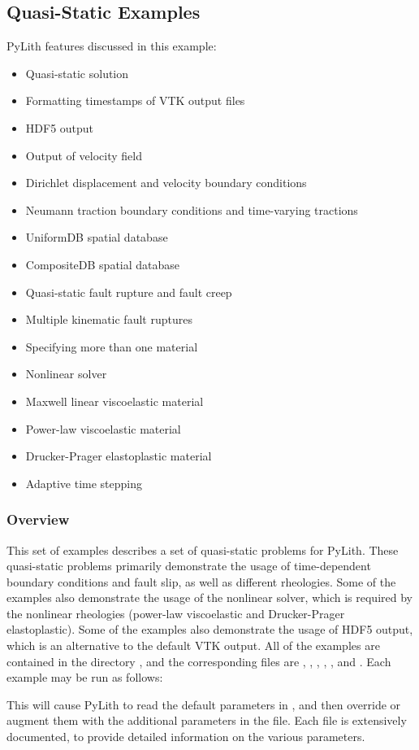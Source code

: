 \subsection{Quasi-Static Examples}
\label{sec:example:3dhex8-quasistatic}

PyLith features discussed in this example:
\begin{itemize}
\item Quasi-static solution
\item Formatting timestamps of VTK output files
\item HDF5 output
\item Output of velocity field
\item Dirichlet displacement and velocity boundary conditions
\item Neumann traction boundary conditions and time-varying tractions
\item UniformDB spatial database
\item CompositeDB spatial database
\item Quasi-static fault rupture and fault creep
\item Multiple kinematic fault ruptures
\item Specifying more than one material
\item Nonlinear solver
\item Maxwell linear viscoelastic material
\item Power-law viscoelastic material
\item Drucker-Prager elastoplastic material
\item Adaptive time stepping
\end{itemize}

\subsubsection{Overview}

This set of examples describes a set of quasi-static problems for
PyLith. These quasi-static problems primarily demonstrate the usage
of time-dependent boundary conditions and fault slip, as well as different
rheologies. Some of the examples also demonstrate the usage of the
nonlinear solver, which is required by the nonlinear rheologies (power-law
viscoelastic and Drucker-Prager elastoplastic). Some of the examples
also demonstrate the usage of HDF5 output, which is an alternative
to the default VTK output. All of the examples are contained in the
directory , and the corresponding 
files are , , ,
, , and .
Each example may be run as follows:
This will cause PyLith to read the default parameters in ,
and then override or augment them with the additional parameters in
the  file. Each  file is extensively
documented, to provide detailed information on the various parameters.


